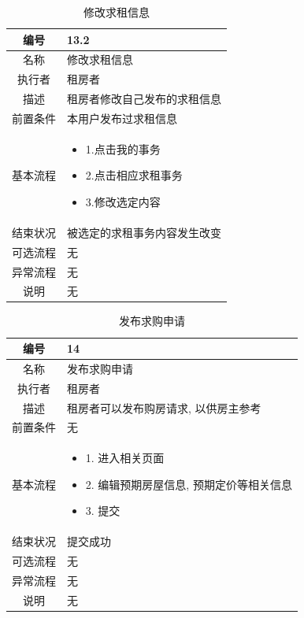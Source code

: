 \begin{table}[htbp]
	\centering
	\begin{tabular}{|c|p{11cm}|}
        \hline
        编号 & 13.2 \\
        \hline
        名称 & 修改求租信息 \\ 
        \hline
        执行者 & 租房者 \\
        \hline
        描述 & 租房者修改自己发布的求租信息 \\
        \hline
        前置条件 & 本用户发布过求租信息 \\
        \hline
        基本流程 & \begin{itemize}
            \item 1.点击我的事务
            \item 2.点击相应求租事务
            \item 3.修改选定内容
        \end{itemize} \\
        \hline
        结束状况 & 被选定的求租事务内容发生改变 \\
        \hline
        可选流程 & 无 \\
        \hline
        异常流程 & 无 \\
        \hline
        说明 & 无 \\
        \hline
    \end{tabular}
    \caption{修改求租信息}
\end{table}

\begin{table}[htbp]
	\centering
	\begin{tabular}{|c|p{11cm}|}
        \hline
        编号 & 14 \\
        \hline
        名称 & 发布求购申请 \\ 
        \hline
        执行者 & 租房者 \\
        \hline
        描述 & 租房者可以发布购房请求, 以供房主参考\\
        \hline
        前置条件 & 无 \\
        \hline
        基本流程 & \begin{itemize}
            \item 1. 进入相关页面
            \item 2. 编辑预期房屋信息, 预期定价等相关信息
            \item 3. 提交
        \end{itemize} \\
        \hline
        结束状况 & 提交成功 \\
        \hline
        可选流程 & 无 \\
        \hline
        异常流程 & 无 \\
        \hline
        说明 & 无 \\
        \hline
    \end{tabular}
    \caption{发布求购申请}
\end{table}

